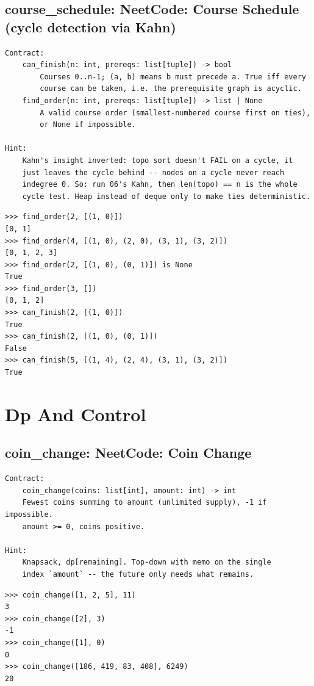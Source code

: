 \documentclass[10pt,letterpaper]{book}
\begin{document}
\section{course\_schedule: NeetCode: Course Schedule (cycle detection via Kahn)}
\begin{lstlisting}[style=ex]
Contract:
    can_finish(n: int, prereqs: list[tuple]) -> bool
        Courses 0..n-1; (a, b) means b must precede a. True iff every
        course can be taken, i.e. the prerequisite graph is acyclic.
    find_order(n: int, prereqs: list[tuple]) -> list | None
        A valid course order (smallest-numbered course first on ties),
        or None if impossible.

Hint:
    Kahn's insight inverted: topo sort doesn't FAIL on a cycle, it
    just leaves the cycle behind -- nodes on a cycle never reach
    indegree 0. So: run 06's Kahn, then len(topo) == n is the whole
    cycle test. Heap instead of deque only to make ties deterministic.
\end{lstlisting}
\begin{lstlisting}[style=ex]
>>> find_order(2, [(1, 0)])
[0, 1]
>>> find_order(4, [(1, 0), (2, 0), (3, 1), (3, 2)])
[0, 1, 2, 3]
>>> find_order(2, [(1, 0), (0, 1)]) is None
True
>>> find_order(3, [])
[0, 1, 2]
>>> can_finish(2, [(1, 0)])
True
>>> can_finish(2, [(1, 0), (0, 1)])
False
>>> can_finish(5, [(1, 4), (2, 4), (3, 1), (3, 2)])
True
\end{lstlisting}
\chapter{Dp And Control}

\section{coin\_change: NeetCode: Coin Change}
\begin{lstlisting}[style=ex]
Contract:
    coin_change(coins: list[int], amount: int) -> int
    Fewest coins summing to amount (unlimited supply), -1 if impossible.
    amount >= 0, coins positive.

Hint:
    Knapsack, dp[remaining]. Top-down with memo on the single
    index `amount` -- the future only needs what remains.
\end{lstlisting}
\begin{lstlisting}[style=ex]
>>> coin_change([1, 2, 5], 11)
3
>>> coin_change([2], 3)
-1
>>> coin_change([1], 0)
0
>>> coin_change([186, 419, 83, 408], 6249)
20
\end{lstlisting}
\end{document}
